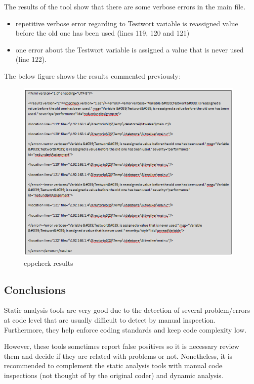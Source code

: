 The results of the tool show that there are some verbose errors in the main file.

\begin{itemize}
\item repetitive verbose error regarding to Testwort variable is reassigned value before the old one has been used (lines 119, 120 and 121)
\item one error about the Testwort variable is assigned a value that is never used (line 122).
\end{itemize}  

The below figure shows the results commented previously:
\begin{figure}[H]
\centering
\includegraphics{./figures/cppcheck.png}
\caption{cppcheck results}
\end{figure}

\subsection{Conclusions}

Static analysis tools are very good due to the detection of several problem/errors at code level that are usually difficult to detect by manual inspection. Furthermore, they help enforce coding standards and keep code complexity low.

However, these tools sometimes report false positives so it is necessary review them and decide if they are related with problems or not. Nonetheless, it is recommended to complement the static analysis tools with manual code inspections (not thought of by the original coder) and dynamic analysis.

